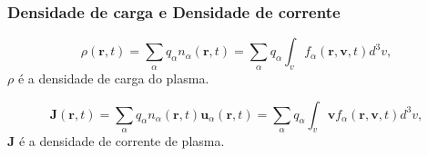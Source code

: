 \documentclass[aspectratio=169]{beamer}
\begin{document}
    \begin{frame}
\frametitle{Densidade de carga e Densidade de corrente}
\begin{equation}
\label{eq: rho}
\rho(\bm{r},t) = \sum_\alpha q_\alpha n_\alpha(\bm{r},t) = \sum_\alpha q_\alpha \int_v f_\alpha(\bm{r},\bm{v},t) d^3v,
\end{equation}
$\rho$ é a densidade de carga do plasma. 

\begin{equation}
\label{eq: densidadecorrente}
\bm{J}(\bm{r},t) = \sum_\alpha q_\alpha n_\alpha(\bm{r},t) \bm{u}_\alpha(\bm{r},t) = \sum_\alpha  q_\alpha \int_v \bm{v} f_\alpha(\bm{r},\bm{v},t) d^3v,
\end{equation}
$\bm{J}$ é a densidade de corrente de plasma. 

\end{frame}
\end{document}
